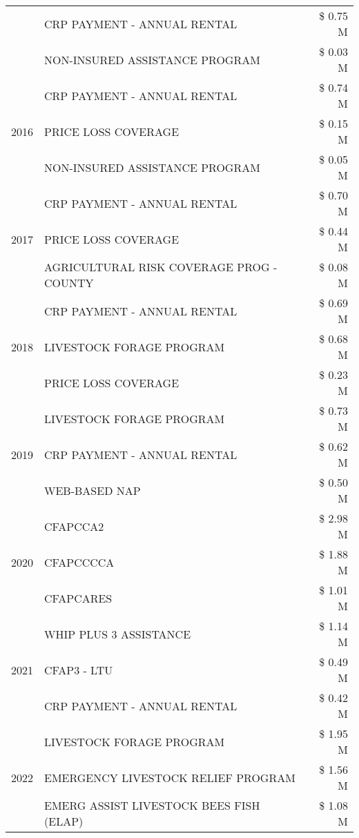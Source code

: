 \begin{tabular}{llr}
 & CRP PAYMENT - ANNUAL RENTAL & \$ 0.75 M \\
 & NON-INSURED ASSISTANCE PROGRAM & \$ 0.03 M \\
\cline{1-3}
\multirow[t]{3}{*}{2016} & CRP PAYMENT - ANNUAL RENTAL & \$ 0.74 M \\
 & PRICE LOSS COVERAGE & \$ 0.15 M \\
 & NON-INSURED ASSISTANCE PROGRAM & \$ 0.05 M \\
\cline{1-3}
\multirow[t]{3}{*}{2017} & CRP PAYMENT - ANNUAL RENTAL & \$ 0.70 M \\
 & PRICE LOSS COVERAGE & \$ 0.44 M \\
 & AGRICULTURAL RISK COVERAGE PROG - COUNTY & \$ 0.08 M \\
\cline{1-3}
\multirow[t]{3}{*}{2018} & CRP PAYMENT - ANNUAL RENTAL & \$ 0.69 M \\
 & LIVESTOCK FORAGE PROGRAM & \$ 0.68 M \\
 & PRICE LOSS COVERAGE & \$ 0.23 M \\
\cline{1-3}
\multirow[t]{3}{*}{2019} & LIVESTOCK FORAGE PROGRAM & \$ 0.73 M \\
 & CRP PAYMENT - ANNUAL RENTAL & \$ 0.62 M \\
 & WEB-BASED NAP & \$ 0.50 M \\
\cline{1-3}
\multirow[t]{3}{*}{2020} & CFAPCCA2 & \$ 2.98 M \\
 & CFAPCCCCA & \$ 1.88 M \\
 & CFAPCARES & \$ 1.01 M \\
\cline{1-3}
\multirow[t]{3}{*}{2021} & WHIP PLUS 3 ASSISTANCE & \$ 1.14 M \\
 & CFAP3 - LTU & \$ 0.49 M \\
 & CRP PAYMENT - ANNUAL RENTAL & \$ 0.42 M \\
\cline{1-3}
\multirow[t]{3}{*}{2022} & LIVESTOCK FORAGE PROGRAM & \$ 1.95 M \\
 & EMERGENCY LIVESTOCK RELIEF PROGRAM & \$ 1.56 M \\
 & EMERG ASSIST LIVESTOCK BEES FISH (ELAP) & \$ 1.08 M \\
\cline{1-3}
\bottomrule
\end{tabular}
